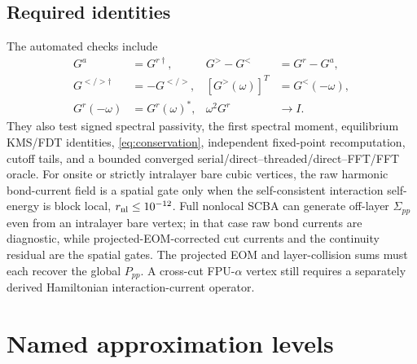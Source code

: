 \documentclass[11pt]{article}
\renewcommand{\_}{\OriginalTextUnderscore\allowbreak}
\begin{document}
\subsection{Required identities}

The automated checks include
\begin{align}
G^a&=G^{r\dagger},&
G^>-G^<&=G^r-G^a,\\
G^{</>\dagger}&=-G^{</>},&
[G^>(\omega)]^T&=G^<(-\omega),\\
G^r(-\omega)&=G^r(\omega)^*,&
\omega^2G^r&\rightarrow I .
\end{align}
They also test signed spectral passivity, the first spectral moment,
equilibrium KMS/FDT identities, \cref{eq:conservation}, independent fixed-point
recomputation, cutoff tails, and a bounded converged
serial/direct--threaded/direct--FFT/FFT oracle. For onsite or strictly
intralayer bare cubic vertices, the raw harmonic bond-current field is a
spatial gate only when the self-consistent interaction self-energy is block
local, \(r_{\rm nl}\leq10^{-12}\). Full nonlocal SCBA can generate off-layer
\(\Sigma_{pp}\) even from an intralayer bare vertex; in that case raw bond
currents are diagnostic, while projected-EOM-corrected cut currents and the
continuity residual are the spatial gates. The projected EOM and
layer-collision sums must each recover the global \(P_{pp}\). A cross-cut
FPU-\(\alpha\) vertex still requires a separately derived Hamiltonian
interaction-current operator.

\section{Named approximation levels}
\label{sec:approximations}
\end{document}
